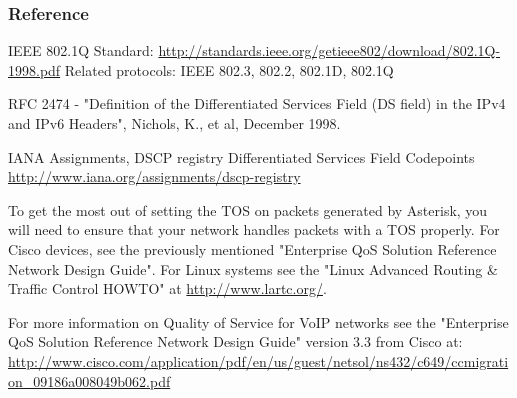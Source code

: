 \subsubsection{Reference}

IEEE 802.1Q Standard:
\url{http://standards.ieee.org/getieee802/download/802.1Q-1998.pdf}
Related protocols: IEEE 802.3, 802.2, 802.1D, 802.1Q

RFC 2474 - "Definition of the Differentiated Services Field
(DS field) in the IPv4 and IPv6 Headers", Nichols, K., et al,
December 1998.

IANA Assignments, DSCP registry
Differentiated Services Field Codepoints
\url{http://www.iana.org/assignments/dscp-registry}

To get the most out of setting the TOS on packets generated by
Asterisk, you will need to ensure that your network handles packets
with a TOS properly.  For Cisco devices, see the previously mentioned
"Enterprise QoS Solution Reference Network Design Guide".  For Linux
systems see the "Linux Advanced Routing \& Traffic Control HOWTO" at 
\url{http://www.lartc.org/}.

For more information on Quality of
Service for VoIP networks see the "Enterprise QoS Solution Reference
Network Design Guide" version 3.3 from Cisco at:
\url{http://www.cisco.com/application/pdf/en/us/guest/netsol/ns432/c649/ccmigration\_09186a008049b062.pdf}

